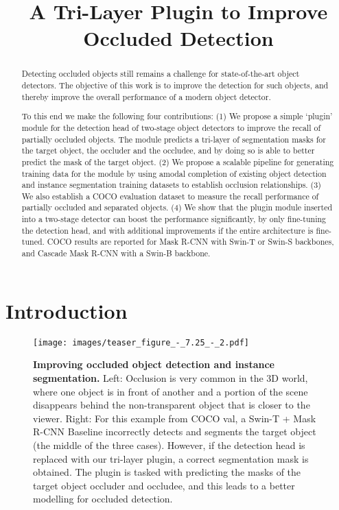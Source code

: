 \documentclass{bmvc2k}
\title{A Tri-Layer Plugin to Improve \\ Occluded Detection}
\begin{document}
\maketitle

\begin{abstract}
Detecting occluded objects still remains a challenge for state-of-the-art object detectors.
The objective of this work is to improve the detection for such objects, and thereby improve the overall performance of a modern object detector.

To this end we make the following four contributions:
(1) We propose a simple `plugin' module for the detection head of two-stage object detectors to improve the 
recall of partially occluded objects. The module predicts a tri-layer of  segmentation masks for the target
object, the occluder and the occludee, and by doing so is able to better predict the mask of the target object.
(2) We propose a scalable pipeline for generating training data for the module by using amodal completion of existing
object detection and instance segmentation training datasets to establish occlusion relationships.
(3) We also establish a COCO evaluation dataset to measure the recall performance of  partially occluded and separated objects.
(4) We show that the plugin module inserted into a two-stage detector can boost the performance significantly, by only fine-tuning the detection head, and with additional improvements if 
the entire architecture is fine-tuned. COCO results are reported for
Mask R-CNN with Swin-T or Swin-S backbones, and Cascade Mask R-CNN with a Swin-B backbone.
\end{abstract}




 

\section{Introduction}
\label{sec:intro}


\begin{figure*}[t]
	\centering
\texttt{[image: images/teaser\_figure\_-\_7.25\_-\_2.pdf]}
	\caption{
	\textcolor{bmvc_blue}{\textbf{Improving occluded object detection and instance segmentation.} 
 Left: Occlusion is very common in the 3D world, where one object is in front of another and a portion of the scene disappears behind the non-transparent object that is closer to the viewer.
Right: For this example from COCO val,
a Swin-T + Mask R-CNN Baseline incorrectly detects and segments the target object (the middle of the three cases). However, if the detection head is replaced with our tri-layer plugin, a correct segmentation mask is obtained. The plugin is tasked with predicting the masks of the target object occluder and occludee, and this leads to a better modelling for occluded detection.
}
	} 
	\label{figure:teaser}
	\end{figure*}
\end{document}
